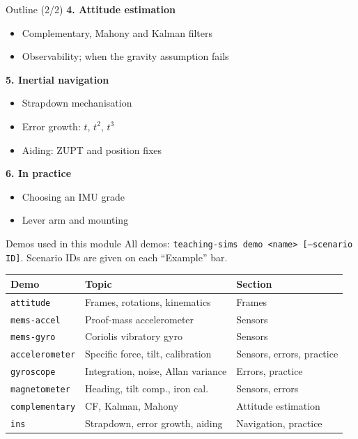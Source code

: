 \begin{frame}{Outline (2/2)}
  \small
  \textbf{4. Attitude estimation}
  \begin{itemize}
    \item Complementary, Mahony and Kalman filters
    \item Observability; when the gravity assumption fails
  \end{itemize}
  \textbf{5. Inertial navigation}
  \begin{itemize}
    \item Strapdown mechanisation
    \item Error growth: $t$, $t^2$, $t^3$
    \item Aiding: ZUPT and position fixes
  \end{itemize}
  \textbf{6. In practice}
  \begin{itemize}
    \item Choosing an IMU grade
    \item Lever arm and mounting
  \end{itemize}
\end{frame}

\begin{frame}{Demos used in this module}
  \small
  All demos: \texttt{teaching-sims demo <name> [--scenario ID]}. Scenario IDs are given on each ``Example'' bar.
  \vspace{0.6em}

  \begin{tabular}{@{}lll@{}}
    \toprule
    Demo & Topic & Section \\
    \midrule
    \texttt{attitude}      & Frames, rotations, kinematics      & Frames \\
    \texttt{mems-accel}    & Proof-mass accelerometer           & Sensors \\
    \texttt{mems-gyro}     & Coriolis vibratory gyro            & Sensors \\
    \texttt{accelerometer} & Specific force, tilt, calibration  & Sensors, errors, practice \\
    \texttt{gyroscope}     & Integration, noise, Allan variance & Errors, practice \\
    \texttt{magnetometer}  & Heading, tilt comp., iron cal.     & Sensors, errors \\
    \texttt{complementary} & CF, Kalman, Mahony                 & Attitude estimation \\
    \texttt{ins}           & Strapdown, error growth, aiding    & Navigation, practice \\
    \bottomrule
  \end{tabular}
\end{frame}
